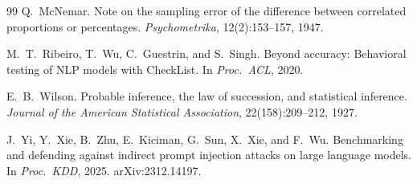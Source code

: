 \documentclass[11pt]{article}
\begin{document}
\begin{thebibliography}{99}
Q.~McNemar.
\newblock Note on the sampling error of the difference between correlated proportions or percentages.
\newblock \emph{Psychometrika}, 12(2):153--157, 1947.

M.~T.~Ribeiro, T.~Wu, C.~Guestrin, and S.~Singh.
\newblock Beyond accuracy: Behavioral testing of NLP models with CheckList.
\newblock In \emph{Proc.\ ACL}, 2020.

E.~B.~Wilson.
\newblock Probable inference, the law of succession, and statistical inference.
\newblock \emph{Journal of the American Statistical Association}, 22(158):209--212, 1927.

J.~Yi, Y.~Xie, B.~Zhu, E.~Kiciman, G.~Sun, X.~Xie, and F.~Wu.
\newblock Benchmarking and defending against indirect prompt injection attacks on large language models.
\newblock In \emph{Proc.\ KDD}, 2025. arXiv:2312.14197.

\end{thebibliography}
\end{document}
